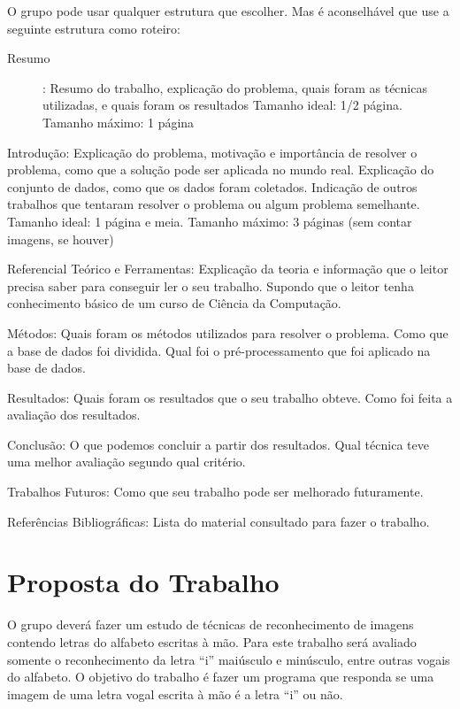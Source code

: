 \documentclass[12pt]{article}
\begin{document}
O grupo pode usar qualquer estrutura que escolher. Mas é aconselhável que use a seguinte estrutura como roteiro:

\begin{description}
\item[Resumo]:
Resumo do trabalho, explicação do problema, quais foram as técnicas utilizadas, e quais foram os resultados
Tamanho ideal: 1/2 página. Tamanho máximo: 1 página
\end{description}


Introdução:
Explicação do problema, motivação e importância de resolver o problema, como que a solução pode ser aplicada no mundo real. Explicação do conjunto de dados, como que os dados foram coletados. Indicação de outros trabalhos que tentaram resolver o problema ou algum problema semelhante.
Tamanho ideal: 1 página e meia. Tamanho máximo: 3 páginas (sem contar imagens, se houver)


Referencial Teórico e Ferramentas:
Explicação da teoria e informação que o leitor precisa saber para conseguir ler o seu trabalho. Supondo que o leitor tenha conhecimento básico de um curso de Ciência da Computação.


Métodos:
Quais foram os métodos utilizados para resolver o problema. Como que a base de dados foi dividida. Qual foi o pré-processamento que foi aplicado na base de dados.


Resultados:
Quais foram os resultados que o seu trabalho obteve. Como foi feita a avaliação dos resultados.


Conclusão:
O que podemos concluir a partir dos resultados. Qual técnica teve uma melhor avaliação segundo qual critério.


Trabalhos Futuros:
Como que seu trabalho pode ser melhorado futuramente.


Referências Bibliográficas:
Lista do material consultado para fazer o trabalho.



\section{Proposta do Trabalho}

O grupo deverá fazer um estudo de técnicas de reconhecimento de imagens contendo letras do alfabeto escritas à mão. Para este trabalho será avaliado somente o reconhecimento da letra “i” maiúsculo e minúsculo, entre outras vogais do alfabeto. O objetivo do trabalho é fazer um programa que responda se uma imagem de uma letra vogal escrita à mão é a letra “i” ou não.
\end{document}
